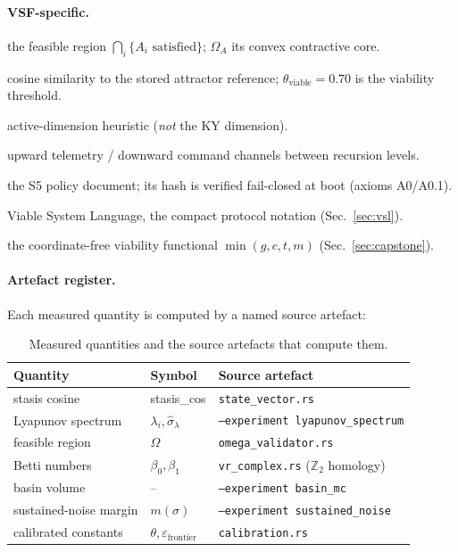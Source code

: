 \documentclass[11pt, a4paper]{article}
\begin{document}
\paragraph{VSF-specific.}
\begin{description}\itemsep2pt
  \item[$\Omega$] the feasible region $\bigcap_i\{A_i \text{ satisfied}\}$;
    $\Omega_A$ its convex contractive core.
  \item[stasis\_cos] cosine similarity to the stored attractor reference;
    $\theta_\text{viable}=0.70$ is the viability threshold.
  \item[$D_\text{eff}$] active-dimension heuristic (\emph{not} the KY dimension).
  \item[$\varphi^\uparrow/\varphi^\downarrow$] upward telemetry / downward
    command channels between recursion levels.
  \item[Covenant] the S5 policy document; its hash is verified fail-closed at
    boot (axioms A0/A0.1).
  \item[VSL] Viable System Language, the compact protocol notation
    (Sec.~\ref{sec:vsl}).
  \item[$V$] the coordinate-free viability functional
    $\min(g,c,t,m)$ (Sec.~\ref{sec:capstone}).
\end{description}

\paragraph{Artefact register.} Each measured quantity is computed by a named
source artefact:

\begin{table}[!htb]
\centering
\small
\begin{tabular}{lll}
\toprule
Quantity & Symbol & Source artefact \\
\midrule
stasis cosine          & stasis\_cos          & \texttt{state\_vector.rs} \\
Lyapunov spectrum      & $\lambda_i, \hat\sigma_\lambda$ & \texttt{--experiment lyapunov\_spectrum} \\
feasible region        & $\Omega$             & \texttt{omega\_validator.rs} \\
Betti numbers          & $\beta_0,\beta_1$    & \texttt{vr\_complex.rs} ($\mathbb{Z}_2$ homology) \\
basin volume           & --                   & \texttt{--experiment basin\_mc} \\
sustained-noise margin & $m(\sigma)$          & \texttt{--experiment sustained\_noise} \\
calibrated constants   & $\theta,\varepsilon_\text{frontier}$ & \texttt{calibration.rs} \\
\bottomrule
\end{tabular}
\caption{Measured quantities and the source artefacts that compute them.}
\label{tab:artefacts}
\end{table}
\end{document}
